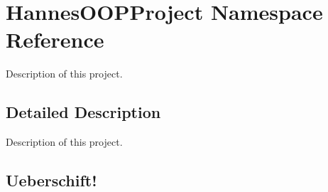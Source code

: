 \hypertarget{namespace_hannes_o_o_p_project}{}\section{Hannes\+O\+O\+P\+Project Namespace Reference}
\label{namespace_hannes_o_o_p_project}


Description of this project.  




\subsection{Detailed Description}
Description of this project. 

\subsection*{Ueberschift! }